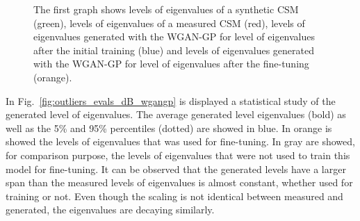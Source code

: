 \documentclass[11pt,a4paper,twoside]{report}
\begin{document}
\begin{figure}
    \centering
    \caption{The first graph shows levels of eigenvalues of a synthetic CSM (green), levels of eigenvalues of a measured CSM (red), levels of eigenvalues generated with the WGAN-GP for level of eigenvalues after the initial training (blue) and levels of eigenvalues generated with the WGAN-GP for level of eigenvalues after the fine-tuning (orange).}
    \label{fig:samples_evals_dB_wgangp}
\end{figure}

In Fig.~\ref{fig:outliers_evals_dB_wgangp} is displayed a statistical study of the generated level of eigenvalues. The average generated level eigenvalues (bold) as well as the 5\% and 95\% percentiles (dotted) are showed in blue. In orange is showed the levels of eigenvalues that was used for fine-tuning. In gray are showed, for comparison purpose, the levels of eigenvalues that were not used to train this model for fine-tuning. It can be observed that the generated levels have a larger span than the measured levels of eigenvalues is almost constant, whether used for training or not. Even though the scaling is not identical between measured and generated, the eigenvalues are decaying similarly.
\end{document}
